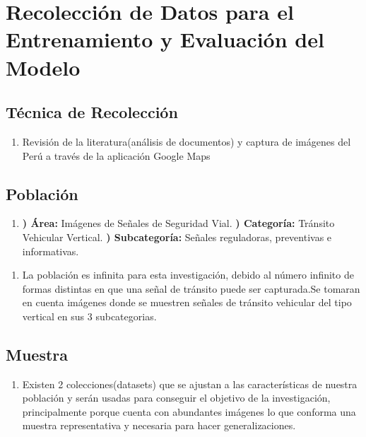 	\section{Recolección de Datos para el Entrenamiento y Evaluación del Modelo}
		\subsection{Técnica de Recolección}
		\begin{enumerate}		
			\item[]  Revisión de la literatura(análisis de documentos) y captura de imágenes del Perú a través de la aplicación Google Maps
		\end{enumerate}

		\subsection{Población} 
		\begin{enumerate}
		\item[]				
		{\bf *) Área:} Imágenes de Señales de Seguridad Vial.\vskip 0.1cm
		{\bf *) Categoría:} Tránsito Vehicular Vertical.\vskip 0.1cm
		{\bf *) Subcategoría:} Señales reguladoras, preventivas e informativas.\vskip 0.1cm
		\end{enumerate}
		\begin{enumerate}		
			\item[]  La población es infinita para esta investigación, debido al número infinito de formas distintas en que una señal de tránsito puede ser capturada.Se tomaran en cuenta imágenes donde se muestren señales de tránsito vehicular del tipo vertical en sus 3 subcategorias.
		\end{enumerate}

		\subsection{Muestra} 
		\begin{enumerate}		
			\item[]	Existen 2 colecciones(datasets) que se ajustan a las características de nuestra población y serán usadas para conseguir el objetivo de la investigación, principalmente porque cuenta con abundantes imágenes lo que conforma una muestra representativa y necesaria para hacer generalizaciones. 
		\end{enumerate}
		
